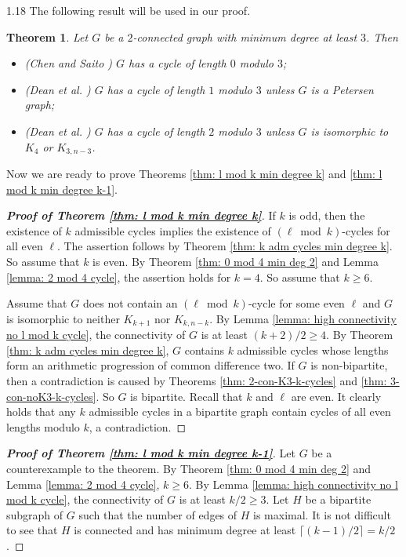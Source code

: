 \documentclass[10pt]{article}
\newtheorem{theorem}{Theorem}[section]
\begin{document}
\begin{spacing}{1.18}
The following result will be used in our proof.

\begin{theorem}\label{thm: ChenSaitoDeanetal}
    Let $G$ be a $2$-connected graph with minimum degree at least $3$. Then
    \begin{itemize}
        \item[(1)] (Chen and Saito \cite{CS94}) $G$ has a cycle of length $0$ modulo $3$;
        \item[(2)] (Dean et al. \cite{D+91}) $G$ has a cycle of length $1$ modulo $3$ unless $G$ is a Petersen graph;
        \item[(3)] (Dean et al. \cite{D+91}) $G$ has a cycle of length $2$ modulo $3$ unless $G$ is isomorphic to $K_4$ or $K_{3,n-3}$.
    \end{itemize}
\end{theorem}

Now we are ready to prove Theorems \ref{thm: l mod k min degree k} and \ref{thm: l mod k min degree k-1}.

\begin{proof}[\bf Proof of Theorem \ref{thm: l mod k min degree k}] 
    If $k$ is odd, then the existence of $k$ admissible cycles implies the existence of $(\ell\bmod k)$-cycles for all even $\ell$. The assertion follows by Theorem \ref{thm: k adm cycles min degree k}. So assume that $k$ is even. By Theorem \ref{thm: 0 mod 4 min deg 2} and Lemma \ref{lemma: 2 mod 4 cycle}, the assertion holds for $k=4$. So assume that $k\geqslant 6$. 
    
    Assume that $G$ does not contain an $(\ell\bmod k)$-cycle for some even $\ell$ and $G$ is isomorphic to neither $K_{k+1}$ nor $K_{k,n-k}$. By Lemma \ref{lemma: high connectivity no l mod k cycle}, the connectivity of $G$ is at least $(k+2)/2\geqslant 4$. By Theorem \ref{thm: k adm cycles min degree k}, $G$ contains $k$ admissible cycles whose lengths form an arithmetic progression of common difference two. If $G$ is non-bipartite, then a contradiction is caused by Theorems \ref{thm: 2-con-K3-k-cycles} and \ref{thm: 3-con-noK3-k-cycles}. So $G$ is bipartite. Recall that $k$ and $\ell$ are even. It clearly holds that any $k$ admissible cycles in a bipartite graph contain cycles of all even lengths modulo $k$, a contradiction.  
\end{proof}


\begin{proof}[\bf Proof of Theorem \ref{thm: l mod k min degree k-1}]
    Let $G$ be a counterexample to the theorem. By Theorem \ref{thm: 0 mod 4 min deg 2} and Lemma \ref{lemma: 2 mod 4 cycle}, $k\geqslant 6$. By Lemma \ref{lemma: high connectivity no l mod k cycle}, the connectivity of $G$ is at least $k/2\geqslant 3$. Let $H$ be a bipartite subgraph of $G$ such that the number of edges of $H$ is maximal. 
    It is not difficult to see that $H$ is connected and has minimum degree at least $\lceil(k-1)/2\rceil=k/2$. 


\end{proof}
\end{spacing}
\end{document}
